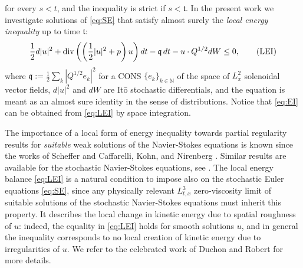 \documentclass[10pt,a4paper]{amsart}
\numberwithin{equation}{section}
\numberwithin{corollario}{section}
\numberwithin{lemma}{section}
\numberwithin{prop}{section}
\theoremstyle{definition}
\theoremstyle{remark}
\newcommand{\N}{\mathbb{N}}
\newcommand{\dvg}{\mathord{{\rm div}}}
\begin{document}
for every $s <t$, and the inequality is strict if $s<\mathfrak{t}$.
In the present work we investigate solutions of \eqref{eq:SE} that satisfy almost surely the \emph{local energy inequality} up to time $\mathfrak{t}$:
\begin{align} \label{eq:LEI} 
\frac12 d |u|^2
+
\dvg\left( \left( \frac12 |u|^2 + p \right) u \right)dt
-
\mathfrak{q}\,dt
-
u \cdot Q^{1/2} dW
\leq 0,\tag{LEI}
\end{align}
where $\mathfrak{q} := \frac12 \sum_{k} |Q^{1/2}e_k|^2$ for a CONS $\{e_k\}_{k \in \N}$ of the space of $L^2_x$ solenoidal vector fields, $d|u|^2$ and $dW$ are It\=o stochastic differentials, and the equation is meant as an almost sure identity in the sense of distributions.
Notice that \eqref{eq:EI} can be obtained from \eqref{eq:LEI} by space integration.

The importance of a local form of energy inequality towards partial regularity results for \emph{suitable} weak solutions of the Navier-Stokes equations is known since the works of Scheffer \cite{Sc77} and Caffarelli, Kohn, and Nirenberg \cite{CaKoNi82}. Similar results are available for the stochastic Navier-Stokes equations, see \cite{Ro10,FlRo02}.
The local energy balance \eqref{eq:LEI} is a natural condition to impose also on the stochastic Euler equations \eqref{eq:SE}, since any physically relevant $L^3_{t,x}$ zero-viscosity limit of suitable solutions of the stochastic Navier-Stokes equations must inherit this property.
It describes the local change in kinetic energy due to spatial roughness of $u$: indeed, the equality in \eqref{eq:LEI} holds for smooth solutions $u$, and in general the inequality corresponds to no local creation of kinetic energy due to irregularities of $u$.
We refer to the celebrated work of Duchon and Robert \cite{DuRo00} for more details.
\end{document}
